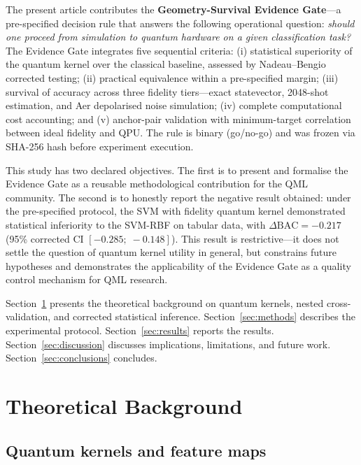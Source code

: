 \documentclass[11pt,a4paper]{article}
\newcommand{\BAC}{\mathrm{BAC}}
\begin{document}
The present article contributes the \textbf{Geometry-Survival Evidence
Gate}---a pre-specified decision rule that answers the following operational
question: \textit{should one proceed from simulation to quantum hardware on a
given classification task?} The Evidence Gate integrates five sequential
criteria: (i) statistical superiority of the quantum kernel over the classical
baseline, assessed by Nadeau--Bengio corrected testing; (ii) practical
equivalence within a pre-specified margin; (iii) survival of accuracy across
three fidelity tiers---exact statevector, 2048-shot estimation, and Aer
depolarised noise simulation; (iv) complete computational cost accounting; and
(v) anchor-pair validation with minimum-target correlation between ideal
fidelity and QPU. The rule is binary (go/no-go) and was frozen via SHA-256
hash before experiment execution.

This study has two declared objectives. The first is to present and formalise
the Evidence Gate as a reusable methodological contribution for the QML
community. The second is to honestly report the negative result obtained: under
the pre-specified protocol, the SVM with fidelity quantum kernel demonstrated
statistical inferiority to the SVM-RBF on tabular data, with $\Delta\BAC =
-0.217$ (95\% corrected CI $[-0.285;\; -0.148]$). This result is
restrictive---it does not settle the question of quantum kernel utility in
general, but constrains future hypotheses and demonstrates the applicability of
the Evidence Gate as a quality control mechanism for QML research.

Section~\ref{sec:theory} presents the theoretical background on quantum
kernels, nested cross-validation, and corrected statistical inference.
Section~\ref{sec:methods} describes the experimental protocol.
Section~\ref{sec:results} reports the results.
Section~\ref{sec:discussion} discusses implications, limitations, and future
work. Section~\ref{sec:conclusions} concludes.

\section{Theoretical Background}
\label{sec:theory}

\subsection{Quantum kernels and feature maps}
\label{ssec:kernels}
\end{document}
